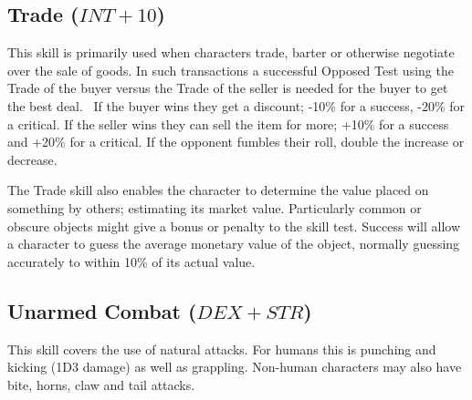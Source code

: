 \subsection{Trade ($INT+10$)}
\label{ssec:trade}
This skill is primarily used when characters trade, barter or otherwise negotiate over the sale of goods. In such transactions a successful Opposed Test using the Trade of the buyer versus the Trade of the seller is needed for the buyer to get the best deal.  If the buyer wins they get a discount; -10\% for a success, -20\% for a critical. If the seller wins they can sell the item for more; +10\% for a success and +20\% for a critical. If the opponent fumbles their roll, double the increase or decrease.

The Trade skill also enables the character to determine the value placed on something by others; estimating its market value. Particularly common or obscure objects might give a bonus or penalty to the skill test. Success will allow a character to guess the average monetary value of the object, normally guessing accurately to within 10\% of its actual value.  


\subsection{Unarmed Combat ($DEX+STR$)}
This skill covers the use of natural attacks. For humans this is punching and kicking (1D3 damage) as well as grappling. Non-human characters may also have bite, horns, claw and tail attacks. 


